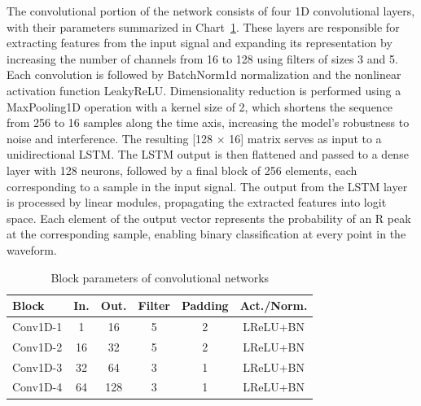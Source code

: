 \documentclass{citask}
\begin{document}
The convolutional portion of the network consists of four 1D convolutional layers, with their parameters summarized in Chart~\ref{tab:ecg_layers}. These layers are responsible for extracting features from the input signal and expanding its representation by increasing the number of channels from 16 to 128 using filters of sizes 3 and 5. Each convolution is followed by BatchNorm1d normalization and the nonlinear activation function LeakyReLU. Dimensionality reduction is performed using a MaxPooling1D operation with a kernel size of 2, which shortens the sequence from 256 to 16 samples along the time axis, increasing the model’s robustness to noise and interference. The resulting [128 × 16] matrix serves as input to a unidirectional LSTM. The LSTM output is then flattened and passed to a dense layer with 128 neurons, followed by a final block of 256 elements, each corresponding to a sample in the input signal. The output from the LSTM layer is processed by linear modules, propagating the extracted features into logit space. Each element of the output vector represents the probability of an R peak at the corresponding sample, enabling binary classification at every point in the waveform.

\begin{table}[h!]
\centering
\caption{Block parameters of convolutional networks}
\label{tab:ecg_layers}
\begin{tabular}{|l|c|c|c|c|c|}
\hline
\textbf{Block} & \textbf{In.} & \textbf{Out.} & \textbf{Filter} & \textbf{Padding} & \textbf{Act./Norm.} \\
\hline
Conv1D-1 & 1   & 16  & 5 & 2 & LReLU+BN \\
Conv1D-2 & 16  & 32  & 5 & 2 & LReLU+BN \\
Conv1D-3 & 32  & 64  & 3 & 1 & LReLU+BN \\
Conv1D-4 & 64  & 128 & 3 & 1 & LReLU+BN \\
\hline
\end{tabular}
\end{table}
\end{document}
